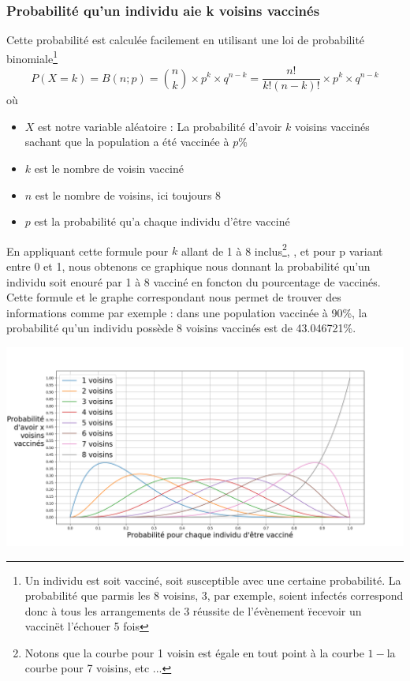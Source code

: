 \documentclass[10pt]{article}
\begin{document}
\subsubsection{Probabilité qu'un individu aie k voisins vaccinés}
\label{sec:kvoisinsvac}
Cette probabilité est calculée facilement en utilisant une loi de probabilité binomiale\footnote{Un individu est soit vacciné, soit susceptible avec une certaine probabilité. La probabilité que parmis les 8 voisins, 3, par exemple, soient infectés correspond donc à tous les arrangements de 3 réussite de l'évènement \"recevoir un vaccin\" et l'échouer 5 fois} $$P(X = k) = B(n;p) = {n \choose k}\times p^k \times q^{n-k} = \frac{n!}{k!(n-k)!}\times p^k \times q^{n-k}$$ où
\begin{itemize}
\item $X$ est notre variable aléatoire : La probabilité d'avoir $k$ voisins vaccinés sachant que la population a été vaccinée à $p$\%
\item $k$ est le nombre de voisin vacciné
\item $n$ est le nombre de voisins, ici toujours 8
\item $p$ est la probabilité qu'a chaque individu d'être vacciné
\end{itemize}
En appliquant cette formule pour $k$ allant de 1 à 8 inclus\footnote{Notons que la courbe pour 1 voisin est égale en tout point à la courbe $1-$la courbe pour 7 voisins, etc ...}, , et pour p variant entre 0 et 1, nous obtenons ce graphique nous donnant la probabilité qu'un individu soit enouré par 1 à 8 vacciné en foncton du pourcentage de vaccinés. Cette formule et le graphe correspondant nous permet de trouver des informations comme par exemple : dans une population vaccinée à 90\%, la probabilité qu'un individu possède 8 voisins vaccinés est de 43.046721\%.
\begin{center}
\includegraphics[scale=0.3]{probNeighbour.png}
\end{center}
\end{document}
